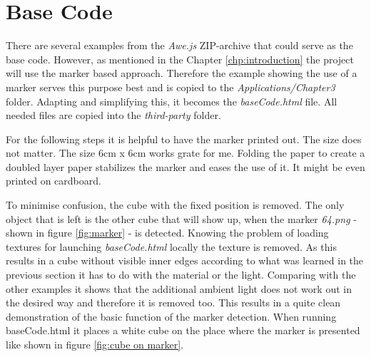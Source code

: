 \section{Base Code}
\label{sec:baseCode}

There are several examples from the \textit{Awe.js} ZIP-archive that could serve as the base code. However, as mentioned in the Chapter \ref{chp:introduction} the project will use the marker based approach. Therefore the example showing the use of a marker serves this purpose best and is copied to the \textit{Applications/Chapter3} folder. 
Adapting and simplifying this, it becomes the \textit{baseCode.html} file.
All needed files are copied into the \textit{third-party} folder. 

For the following steps it is helpful to have the marker printed out. The size does not matter. The size 6cm x 6cm works grate for me. Folding the paper to create a doubled layer paper stabilizes the marker and eases the use of it. It might be even printed on cardboard. 

To minimise confusion, the cube with the fixed position is removed. The only object that is left is the other cube that will show up, when the marker \textit{64.png} - shown in figure \ref{fig:marker} - is detected.
Knowing the problem of loading textures for launching \textit{baseCode.html} locally the texture is removed. As this results in a cube without visible inner edges according to what was learned in the previous section it has to do with the material or the light. Comparing with the other examples it shows that the additional ambient light does not work out in the desired way and therefore it is removed too. This results in a quite clean demonstration of the basic function of the marker detection. When running {baseCode.html} it places a white cube on the place where the marker is presented like shown in figure \ref{fig:cube on marker}.

